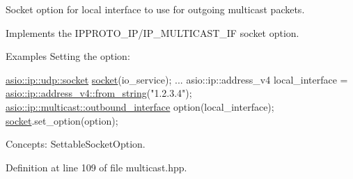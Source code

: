 Socket option for local interface to use for outgoing multicast packets. 

Implements the I\+P\+P\+R\+O\+T\+O\+\_\+\+I\+P/\+I\+P\+\_\+\+M\+U\+L\+T\+I\+C\+A\+S\+T\+\_\+\+I\+F socket option.

\begin{DoxyParagraph}{Examples}
Setting the option\+: 
\begin{DoxyCode}
\hyperlink{classasio_1_1basic__datagram__socket}{asio::ip::udp::socket} \hyperlink{namespacewebsocketpp_1_1transport_1_1asio_1_1socket_1_1error_a828ddaa5ed63a761e1b557465a35f05aa0c31b356014843e1d09514e794a539a7}{socket}(io\_service); 
...
asio::ip::address\_v4 local\_interface =
  \hyperlink{classasio_1_1ip_1_1address__v4_a2fc87f6795a0b86a9ba66e1ce53b66d5}{asio::ip::address\_v4::from\_string}(\textcolor{stringliteral}{"1.2.3.4"});
\hyperlink{classasio_1_1ip_1_1detail_1_1socket__option_1_1network__interface}{asio::ip::multicast::outbound\_interface} option(local\_interface);
\hyperlink{namespacewebsocketpp_1_1transport_1_1asio_1_1socket_1_1error_a828ddaa5ed63a761e1b557465a35f05aa0c31b356014843e1d09514e794a539a7}{socket}.set\_option(option);
\end{DoxyCode}

\end{DoxyParagraph}
\begin{DoxyParagraph}{Concepts\+:}
Settable\+Socket\+Option. 
\end{DoxyParagraph}


Definition at line 109 of file multicast.\+hpp.

